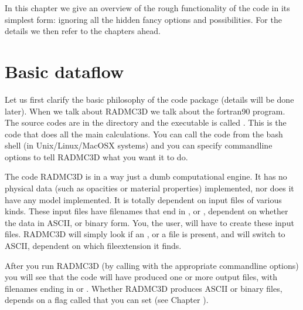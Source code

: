 \documentclass[letterpaper,10pt,english]{sphinxmanual}
\begin{document}
In this chapter we give an overview of the rough functionality of the code
in its simplest form: ignoring all the hidden fancy options and
possibilities. For the details we then refer to the chapters ahead.


\section{Basic dataflow}
\label{\detokenize{basicstructure:basic-dataflow}}\label{\detokenize{basicstructure:sec-dataflow}}
Let us first clarify the basic philosophy of the code package (details will
be done later). When we talk about RADMC\sphinxhyphen{}3D we talk about the
fortran\sphinxhyphen{}90 program. The source codes are in the directory 
and the executable is called . This is the code that does
all the main calculations. You can call the code from the bash shell
(in Unix/Linux/MacOSX systems) and you can specify command\sphinxhyphen{}line options to
tell RADMC\sphinxhyphen{}3D what you want it to do.

The code RADMC\sphinxhyphen{}3D is in a way just a dumb computational engine. It has no
physical data (such as opacities or material properties) implemented, nor does
it have any model implemented. It is totally dependent on input files of various
kinds. These input files have filenames that end in , or ,
dependent on whether the data in ASCII, or binary form. You, the user, will have
to create these input files. RADMC\sphinxhyphen{}3D will simply look if an , or a
 file is present, and will switch to ASCII, dependent on which
file\sphinxhyphen{}extension it finds.

After you run RADMC\sphinxhyphen{}3D (by calling  with the appropriate command\sphinxhyphen{}line
options) you will see that the code will have produced one or more output files,
with filenames ending in  or . Whether RADMC\sphinxhyphen{}3D produces ASCII
or binary files, depends on a flag called  that you can set (see
Chapter {\hyperref[\detokenize{binaryio:chap-binary-io}]{}}).

\end{document}

